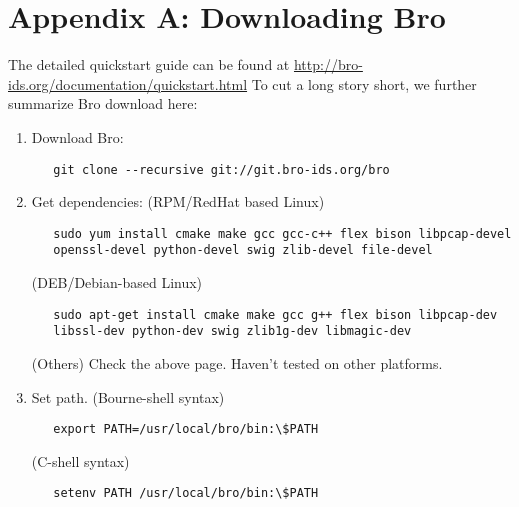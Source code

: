 \documentclass[acmtocl]{acmtrans2m}
\begin{document}
\section{Appendix A: Downloading Bro}
The detailed quickstart guide can be found at 
\url{http://bro-ids.org/documentation/quickstart.html}
To cut a long story short, we further summarize Bro download here:
\begin{enumerate}
\item Download Bro: 
\begin{verbatim}
   git clone --recursive git://git.bro-ids.org/bro
\end{verbatim}

\item Get dependencies:
   (RPM/RedHat based Linux)
   \begin{verbatim}
   sudo yum install cmake make gcc gcc-c++ flex bison libpcap-devel 
   openssl-devel python-devel swig zlib-devel file-devel
   \end{verbatim}
   
   (DEB/Debian-based Linux)
   \begin{verbatim}
   sudo apt-get install cmake make gcc g++ flex bison libpcap-dev 
   libssl-dev python-dev swig zlib1g-dev libmagic-dev
   \end{verbatim}

   (Others)
   Check the above page. Haven't tested on other platforms.
\item Set path.
   (Bourne-shell syntax)
   \begin{verbatim}
   export PATH=/usr/local/bro/bin:\$PATH 
   \end{verbatim}
  
   (C-shell syntax) 
   \begin{verbatim}
   setenv PATH /usr/local/bro/bin:\$PATH
   \end{verbatim}
\appendix

\end{enumerate}



\end{document}
